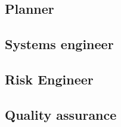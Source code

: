 \subsection{Planner}\label{subsec:Planner}


\subsection{Systems engineer}\label{subsec:SE}


\subsection{Risk Engineer}\label{subsec:RiskEng}


\subsection{Quality assurance}\label{subsec:QA}

